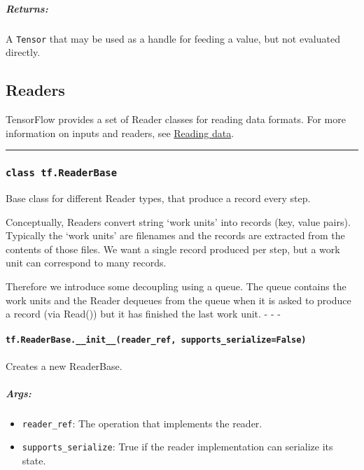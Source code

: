 \subparagraph{Returns: }\label{returns}

A \texttt{Tensor} that may be used as a handle for feeding a value, but
not evaluated directly.

\subsection{Readers }\label{readers}

TensorFlow provides a set of Reader classes for reading data formats.
For more information on inputs and readers, see
\href{../../how_tos/reading_data/index.md}{Reading data}.

\begin{center}\rule{0.5\linewidth}{\linethickness}\end{center}

\subsubsection{\texorpdfstring{\texttt{class\ tf.ReaderBase}
}{class tf.ReaderBase }}\label{class-tf.readerbase}

Base class for different Reader types, that produce a record every step.

Conceptually, Readers convert string `work units' into records (key,
value pairs). Typically the `work units' are filenames and the records
are extracted from the contents of those files. We want a single record
produced per step, but a work unit can correspond to many records.

Therefore we introduce some decoupling using a queue. The queue contains
the work units and the Reader dequeues from the queue when it is asked
to produce a record (via Read()) but it has finished the last work unit.
- - -

\paragraph{\texorpdfstring{\texttt{tf.ReaderBase.\_\_init\_\_(reader\_ref,\ supports\_serialize=False)}
}{tf.ReaderBase.\_\_init\_\_(reader\_ref, supports\_serialize=False) }}\label{tf.readerbase.ux5fux5finitux5fux5freaderux5fref-supportsux5fserializefalse}

Creates a new ReaderBase.

\subparagraph{Args: }\label{args-1}

\begin{itemize}
\tightlist
\item
  \texttt{reader\_ref}: The operation that implements the reader.
\item
  \texttt{supports\_serialize}: True if the reader implementation can
  serialize its state.
\end{itemize}


